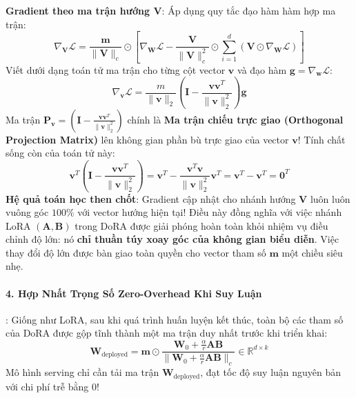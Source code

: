 \textbf{Gradient theo ma trận hướng $\mathbf{V}$}:
Áp dụng quy tắc đạo hàm hàm hợp ma trận:
\begin{equation}
\nabla_{\mathbf{V}} \mathcal{L} = \frac{\mathbf{m}}{\|\mathbf{V}\|_c} \odot \left[ \nabla_{\mathbf{W}} \mathcal{L} - \frac{\mathbf{V}}{\|\mathbf{V}\|_c^2} \odot \sum_{i=1}^d \left( \mathbf{V} \odot \nabla_{\mathbf{W}} \mathcal{L} \right) \right]
\end{equation}
Viết dưới dạng toán tử ma trận cho từng cột vector $\mathbf{v}$ và đạo hàm $\mathbf{g} = \nabla_{\mathbf{w}} \mathcal{L}$:
\begin{equation}
\label{eq:dora-orthogonal-projection}
\nabla_{\mathbf{v}} \mathcal{L} = \frac{m}{\|\mathbf{v}\|_2} \left( \mathbf{I} - \frac{\mathbf{v} \mathbf{v}^T}{\|\mathbf{v}\|_2^2} \right) \mathbf{g}
\end{equation}
Ma trận $\mathbf{P}_{\mathbf{v}} = \left( \mathbf{I} - \frac{\mathbf{v} \mathbf{v}^T}{\|\mathbf{v}\|_2^2} \right)$ chính là \textbf{Ma trận chiếu trực giao (Orthogonal Projection Matrix)} lên không gian phần bù trực giao của vector $\mathbf{v}$!
Tính chất sống còn của toán tử này:
\begin{equation}
\mathbf{v}^T \left( \mathbf{I} - \frac{\mathbf{v} \mathbf{v}^T}{\|\mathbf{v}\|_2^2} \right) = \mathbf{v}^T - \frac{\mathbf{v}^T \mathbf{v}}{\|\mathbf{v}\|_2^2} \mathbf{v}^T = \mathbf{v}^T - \mathbf{v}^T = \mathbf{0}^T
\end{equation}
\textbf{Hệ quả toán học then chốt}: Gradient cập nhật cho nhánh hướng $\mathbf{V}$ luôn luôn vuông góc $100\%$ với vector hướng hiện tại!
Điều này đồng nghĩa với việc nhánh LoRA $(\mathbf{A}, \mathbf{B})$ trong DoRA được giải phóng hoàn toàn khỏi nhiệm vụ điều chỉnh độ lớn: nó \textbf{chỉ thuần túy xoay góc của không gian biểu diễn}. Việc thay đổi độ lớn được bàn giao toàn quyền cho vector tham số $\mathbf{m}$ một chiều siêu nhẹ.

\paragraph{4. Hợp Nhất Trọng Số Zero-Overhead Khi Suy Luận}:
Giống như LoRA, sau khi quá trình huấn luyện kết thúc, toàn bộ các tham số của DoRA được gộp tĩnh thành một ma trận duy nhất trước khi triển khai:
\begin{equation}
\mathbf{W}_{\text{deployed}} = \mathbf{m} \odot \frac{\mathbf{W}_0 + \frac{\alpha}{r} \mathbf{A} \mathbf{B}}{\|\mathbf{W}_0 + \frac{\alpha}{r} \mathbf{A} \mathbf{B}\|_c} \in \mathbb{R}^{d \times k}
\end{equation}
Mô hình serving chỉ cần tải ma trận $\mathbf{W}_{\text{deployed}}$, đạt tốc độ suy luận nguyên bản với chi phí trễ bằng 0!

